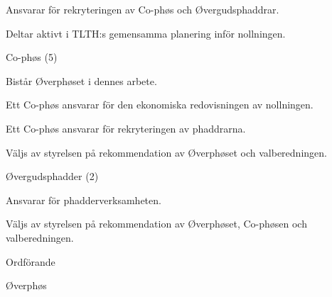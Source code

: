 \documentclass[../_main/handlingar.tex]{subfiles}
\begin{document}
\begin{attsatser}
\begin{emptylist}
\begin{dashlist}
                \item Ansvarar för rekryteringen av Co-phøs och Øvergudsphaddrar.
                \item Deltar aktivt i TLTH:s gemensamma planering inför nollningen.
            \end{dashlist}
        \item Co-phøs (5)
            \begin{dashlist}
                \item Bistår Øverphøset i dennes arbete.
                \item Ett Co-phøs ansvarar för den ekonomiska redovisningen av nollningen.
                \item Ett Co-phøs ansvarar för rekryteringen av phaddrarna.
                \item Väljs av styrelsen på rekommendation av Øverphøset och valberedningen.
            \end{dashlist}
        \item Øvergudsphadder (2)
            \begin{dashlist}
                \item Ansvarar för phadderverksamheten.
                \item Väljs av styrelsen på rekommendation av Øverphøset, Co-phøsen och valberedningen.
            \end{dashlist}
    \end{emptylist}
\end{attsatser}

\begin{signatures}{2}
    \ist
    \signature{\ordf}{Ordförande}
    \signature{Niklas Gustafson}{Øverphøs}
\end{signatures}
\end{document}

